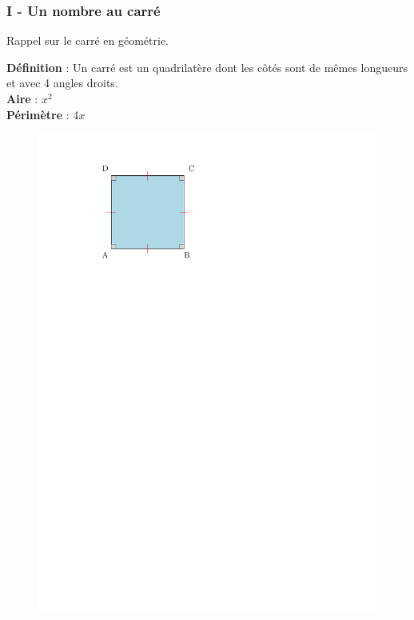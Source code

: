 \documentclass{beamer}
\begin{document}
\begin{frame}
  \frametitle{I - Un nombre au carré}

  \begin{block}{}
	Rappel sur le carré en géométrie.
  \end{block}


\begin{multicols}{2}

 \textbf{Définition} : Un carré est un quadrilatère dont les côtés sont de mêmes longueurs et avec 4 angles droits.\\
\textbf{Aire} : $x^2$\\
\textbf{Périmètre} : $4x$

	\begin{figure}[H]
	  \centering
	  \includegraphics[width=\linewidth]{sources/1/carre.pdf}
	\end{figure}

\end{multicols}


\end{frame}
\end{document}
